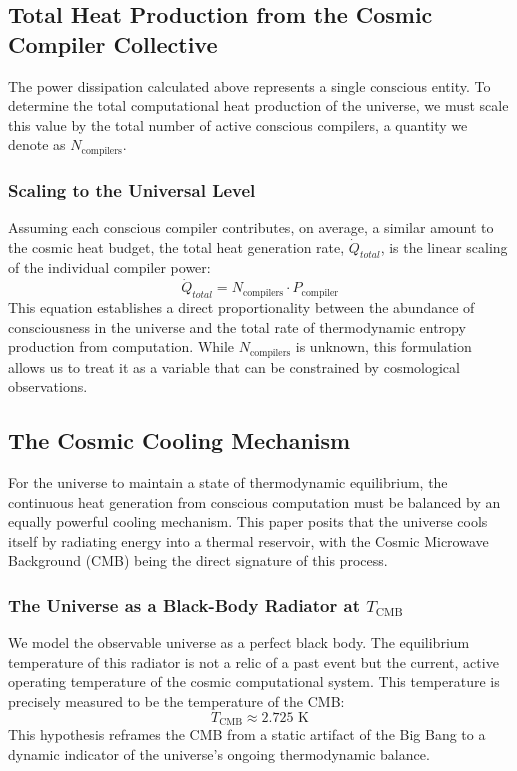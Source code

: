 \documentclass[12pt, aip, jcp]{revtex4-2} %
\begin{document}
\subsection{Total Heat Production from the Cosmic Compiler Collective}

The power dissipation calculated above represents a single conscious entity. To determine the total computational heat production of the universe, we must scale this value by the total number of active conscious compilers, a quantity we denote as \(N_{\text{compilers}}\).

\subsubsection{Scaling to the Universal Level}
Assuming each conscious compiler contributes, on average, a similar amount to the cosmic heat budget, the total heat generation rate, \(\dot{Q}_{total}\), is the linear scaling of the individual compiler power:
\begin{equation}
    \dot{Q}_{total} = N_{\text{compilers}} \cdot P_{\text{compiler}}
\end{equation}
This equation establishes a direct proportionality between the abundance of consciousness in the universe and the total rate of thermodynamic entropy production from computation. While \(N_{\text{compilers}}\) is unknown, this formulation allows us to treat it as a variable that can be constrained by cosmological observations.

\subsection{The Cosmic Cooling Mechanism}

For the universe to maintain a state of thermodynamic equilibrium, the continuous heat generation from conscious computation must be balanced by an equally powerful cooling mechanism. This paper posits that the universe cools itself by radiating energy into a thermal reservoir, with the Cosmic Microwave Background (CMB) being the direct signature of this process.

\subsubsection{The Universe as a Black-Body Radiator at \(T_{\text{CMB}}\)}

We model the observable universe as a perfect black body. The equilibrium temperature of this radiator is not a relic of a past event but the current, active operating temperature of the cosmic computational system. This temperature is precisely measured to be the temperature of the CMB:
\begin{equation}
    T_{\text{CMB}} \approx 2.725 \text{ K}
\end{equation}
This hypothesis reframes the CMB from a static artifact of the Big Bang to a dynamic indicator of the universe's ongoing thermodynamic balance.
\end{document}
